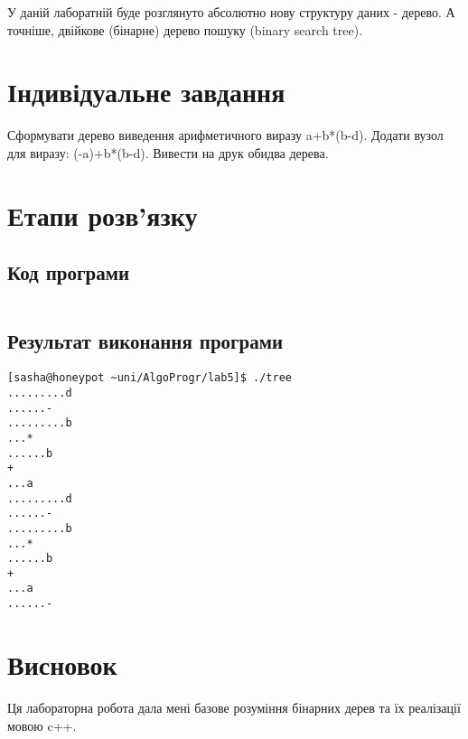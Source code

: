 \documentclass[a4paper, 12pt, oneside]{extarticle}
\begin{document}
\Margins



У даній лаборатній буде розглянуто абсолютно нову структуру даних - дерево.
А точніше, двійкове (бінарне) дерево пошуку (binary search tree).

\section*{Індивідуальне завдання}

Сформувати дерево виведення арифметичного виразу a+b*(b-d). Додати вузол для
виразу: (-a)+b*(b-d). Вивести на друк обидва дерева.

\section*{Етапи розв'язку}

\subsection*{Код програми}

\inputminted{c++}{/home/sasha/Documents/uni/2-сем/AlgoProgr/lab5/tree.cpp}

\subsection*{Результат виконання програми}

\begin{verbatim}
[sasha@honeypot ~uni/AlgoProgr/lab5]$ ./tree
.........d
......-
.........b
...*
......b
+
...a
.........d
......-
.........b
...*
......b
+
...a
......-
\end{verbatim}

\section*{Висновок}

Ця лабораторна робота дала мені базове розуміння бінарних дерев
та їх реалізації мовою c++.
\end{document}
